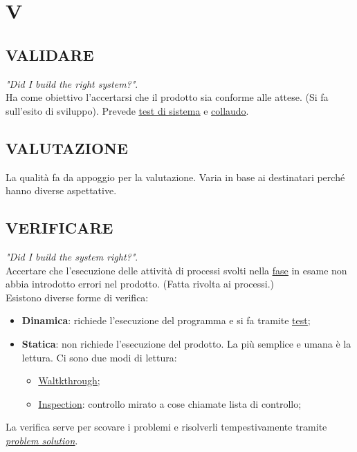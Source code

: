 \newpage
	\section{V} \label{sec:V}
	
		\subsection{VALIDARE}  \label{validare}
		\textit{"Did I build the right system?"}. \\ 
		Ha come obiettivo l'accertarsi che il prodotto sia conforme alle attese. (Si fa sull'esito di sviluppo). Prevede \underline{\hyperref[testsistema]{test di sistema}} e \underline{\hyperref[collaudo]{collaudo}}.
		
		\subsection{VALUTAZIONE}
		La qualità fa da appoggio per la valutazione. Varia in base ai destinatari perché hanno diverse aspettative.
		
		\subsection{VERIFICARE}  \label{verificare}
		\textit{"Did I build the system right?"}. \\
		Accertare che l'esecuzione delle attività di processi svolti nella \underline{\hyperref[fase]{fase}} in esame non abbia introdotto errori nel prodotto. (Fatta rivolta ai processi.) \\
		Esistono diverse forme di verifica:	%
		\begin{itemize}
			\item \textbf{Dinamica}: richiede l'esecuzione del programma e si fa tramite \underline{\hyperref[test]{test}};
			\item \textbf{Statica}: non richiede l'esecuzione del prodotto. La più semplice e umana è la lettura. 
			Ci sono due modi di lettura:
			\begin{itemize}
				\item \underline{\hyperref[walkthrough]{Waltkthrough}};
				\item \underline{\hyperref[inspection]{Inspection}}: controllo mirato a cose chiamate lista di controllo;
			\end{itemize}	
		\end{itemize}
		La verifica serve per scovare i problemi e risolverli tempestivamente tramite \textit{\underline{\hyperref[problemsolution]{problem solution}}}. 
		
